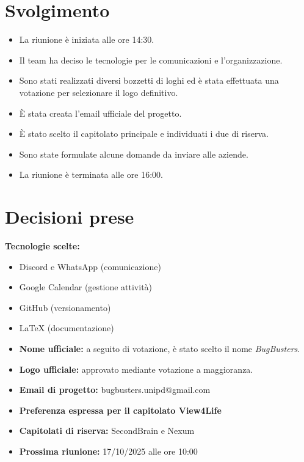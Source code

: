 \documentclass[a4paper,12pt]{article}
\begin{document}
\section{Svolgimento}

\begin{itemize}
    \item La riunione è iniziata alle ore 14:30.
    \item Il team ha deciso le tecnologie per le comunicazioni e l'organizzazione.
    \item Sono stati realizzati diversi bozzetti di loghi ed è stata effettuata una votazione per selezionare il logo definitivo.
    \item È stata creata l'email ufficiale del progetto.
    \item È stato scelto il capitolato principale e individuati i due di riserva.
    \item Sono state formulate alcune domande da inviare alle aziende.
    \item La riunione è terminata alle ore 16:00.
\end{itemize}

\section{Decisioni prese}

\textbf{Tecnologie scelte:}
\begin{itemize}
    \item Discord e WhatsApp (comunicazione)
    \item Google Calendar (gestione attività)
    \item GitHub (versionamento)
    \item LaTeX (documentazione)
\end{itemize}

\begin{itemize}
    \item \textbf{Nome ufficiale:} a seguito di votazione, è stato scelto il nome \emph{BugBusters}.
    \item \textbf{Logo ufficiale:} approvato mediante votazione a maggioranza.
    \item \textbf{Email di progetto:} {\small\textsf{bugbusters.unipd@gmail.com}}
    \item \textbf{Preferenza espressa per il capitolato View4Life}
    \item \textbf{Capitolati di riserva:} SecondBrain e Nexum
    \item \textbf{Prossima riunione:} 17/10/2025 alle ore 10:00
\end{itemize}
\end{document}
